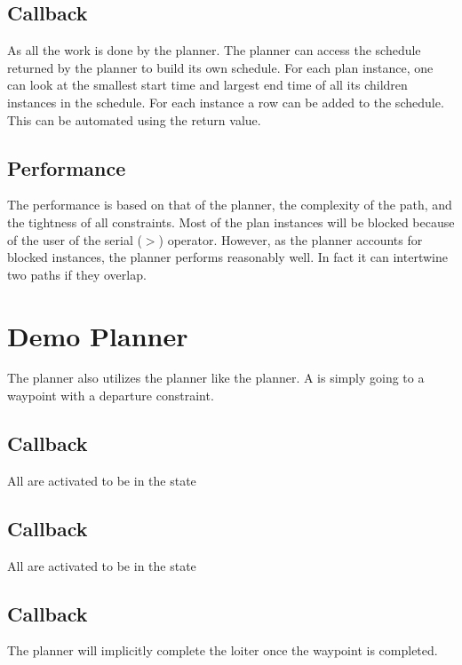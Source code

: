 \subsection{Callback }
As all the work is done by the  planner. The  planner can access the schedule returned by the  planner to build its own schedule. For each  plan instance, one can look at the smallest start time and largest end time of all its children instances in the  schedule. For each  instance a row can be added to the schedule. This can be automated using the  return value.

\subsection{Performance}
The performance is based on that of the  planner, the complexity of the path, and the tightness of all constraints. Most of the plan instances will be blocked because of the user of the serial ($>$) operator. However, as the  planner accounts for blocked instances, the planner performs reasonably well. In fact it can intertwine two paths if they overlap.

\section{Demo  Planner}
The  planner also utilizes the  planner like the  planner. A  is simply going to a waypoint with a departure constraint.

\subsection{Callback }
All are activated to be in the  state

\subsection{Callback }
All are activated to be in the  state

\subsection{Callback }
The  planner will implicitly complete the loiter once the waypoint is completed.

